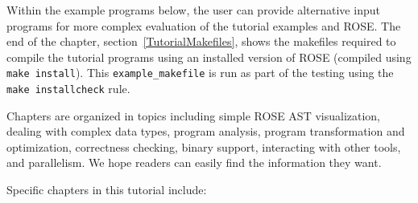 Within the example programs below, the user can provide alternative input programs
for more complex evaluation of the tutorial examples and ROSE.  The end of the chapter,
section~\ref{TutorialMakefiles}, shows the makefiles required to compile the
tutorial programs using an installed version of ROSE (compiled using 
{\tt make install}).  This {\tt example\_makefile} is run as part of the testing using the 
{\tt make installcheck} rule.


Chapters are organized in topics including simple ROSE AST visualization,
dealing with complex data types, program analysis, program transformation
and optimization, correctness checking, binary support, interacting with
other tools, and parallelism. 
We hope readers can easily find the information they want. 

Specific chapters in this tutorial include: 

